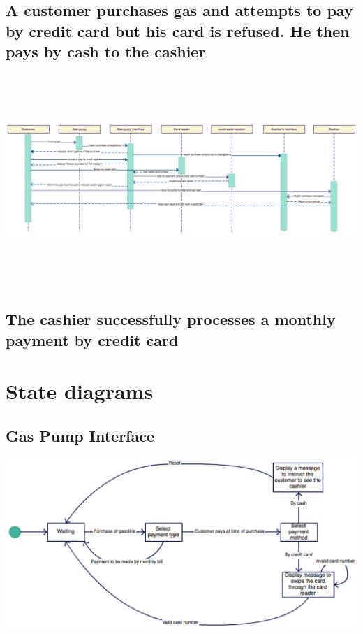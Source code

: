 \documentclass[11pt, a4paper]{article}
\begin{document}
\subsection{A customer purchases gas and attempts to pay by credit card but his card is refused. He then pays by cash to the cashier}

\begin{center}
\includegraphics[width=17cm, height=8cm, angle=90]{credicash.pdf}
\end{center}

\newpage


\subsection{The cashier successfully processes a monthly payment by credit card}

\begin{center}
\end{center}


\newpage

\section{State diagrams}

\subsection{Gas Pump Interface}

\begin{center}
\includegraphics[width=\textwidth]{GasPumpInterface_diagram.pdf}
\end{center}
\end{document}
